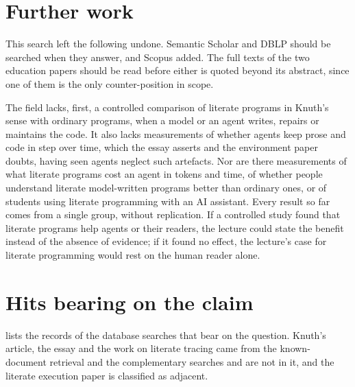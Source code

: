 \section{Further work}
\label{sec:ai-rq1-further}

This search left the following undone.
Semantic Scholar and DBLP should be searched when they answer, and Scopus
added.
The full texts of the two education papers\autocite{Birkenkrahe2024,
Rosiene2024} should be read before either is quoted beyond its abstract, since
one of them is the only counter-position in scope.

The field lacks, first, a controlled comparison of literate programs in Knuth's
sense with ordinary programs, when a model or an agent writes, repairs or
maintains the code.
It also lacks measurements of whether agents keep prose and code in step over
time, which the essay asserts\autocite{Whitlock2026} and the environment paper
doubts, having seen agents neglect such artefacts\autocite{Burke2026notlob}.
Nor are there measurements of what literate programs cost an agent in tokens
and time, of whether people understand literate model-written programs better
than ordinary ones, or of students using literate programming with an AI
assistant.
Every result so far comes from a single group, without replication.
If a controlled study found that literate programs help agents or their
readers, the lecture could state the benefit instead of the absence of
evidence; if it found no effect, the lecture's case for literate programming
would rest on the human reader alone.

\section{Hits bearing on the claim}
\label{sec:ai-rq1-hits}

 lists the records of the database searches that bear
on the question.
Knuth's article, the essay and the work on literate tracing came from the
known-document retrieval and the complementary searches and are not in it, and
the literate execution paper is classified as adjacent.

